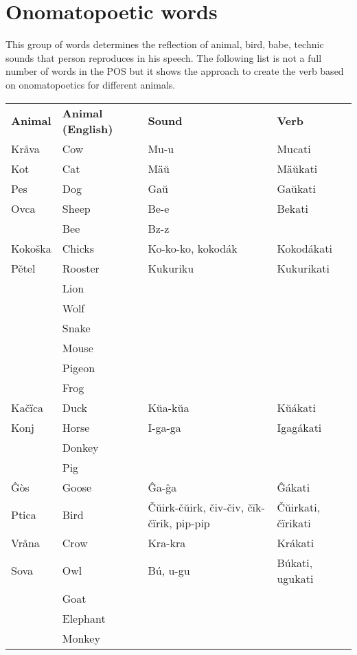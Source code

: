 \section{Onomatopoetic words}

This group of words determines the reflection of animal, bird, babe, technic sounds that person reproduces in his speech. The following list is not a full number of words in the POS but it shows the approach to create the verb based on onomatopoetics for different animals.

\begin{table}
	\begin{tabular}{llp{7em}l}
		\textbf{Animal} & \textbf{Animal (English)} & \textbf{Sound} & \textbf{Verb} \\
		Kråva & Cow & Mu-u & Mucati \\
		Kot & Cat & Mäŭ & Mäŭkati \\
		Pes & Dog & Gaŭ & Gaŭkati \\
		Ovca & Sheep & Be-e & Bekati \\
		& Bee & Bz-z & \\
		Kokoška & Chicks & Ko-ko-ko, kokodák & Kokodákati \\
		Pětel & Rooster & Kukuriku & Kukurikati \\
		& Lion && \\
		& Wolf && \\
		& Snake && \\
		& Mouse && \\
		& Pigeon && \\
		& Frog && \\
		Kačïca & Duck & Kŭa-kŭa & Kŭákati \\
		Konj & Horse & I-ga-ga & Igagákati \\
		& Donkey && \\
		& Pig && \\
		Ĝòs & Goose & Ĝa-ĝa & Ĝákati \\
		Ptica & Bird & Čŭirk-čŭirk, čiv-čiv, čïk-čïrik, pip-pip & Čŭirkati, čïrikati \\
		Vråna & Crow & Kra-kra & Krákati \\
		Sova & Owl & Bú, u-gu & Búkati, ugukati \\
		& Goat && \\
		& Elephant&&\\
		& Monkey&&\\
	\end{tabular}
\end{table}

